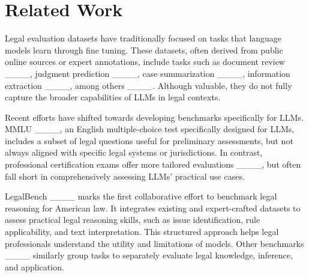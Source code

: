 \section{Related Work}
Legal evaluation datasets have traditionally focused on tasks that language models learn through fine tuning. These datasets, often derived from public online sources or expert annotations, include
tasks such as document review ____, judgment prediction ____, case
summarization ____, information extraction ____, among others ____. Although valuable, they do not fully capture the broader capabilities of LLMs in legal contexts.

Recent efforts have shifted towards developing benchmarks specifically for LLMs. MMLU ____, an English multiple-choice test specifically designed for LLMs, includes a subset of legal questions
useful for preliminary assessments, but not always aligned with specific legal systems or jurisdictions. In contrast, professional certification exams offer more tailored
evaluations ____, but often fall short in comprehensively assessing LLMs’ practical use cases.

LegalBench ____ marks the first collaborative effort to benchmark legal reasoning for American law. It integrates existing and expert-crafted
datasets to assess practical legal reasoning skills, such as issue identification, rule applicability, and
text interpretation. This structured approach helps legal professionals understand the utility and limitations of models. Other benchmarks ____ similarly group tasks to separately evaluate legal knowledge, inference, and application.